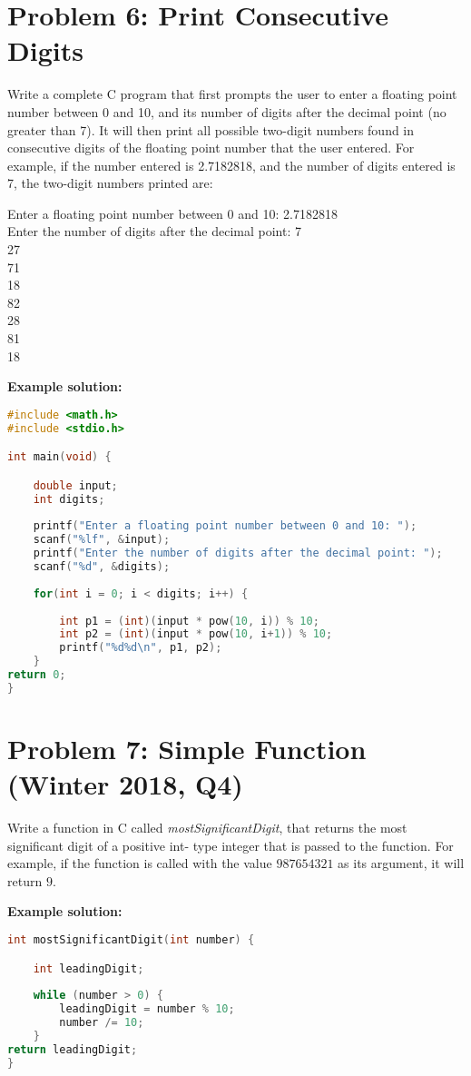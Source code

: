 \documentclass[12pt]{article}
\begin{document}
\section*{Problem 6: Print Consecutive Digits}

Write a complete C program that first prompts the user to enter a floating point number between 0 and 10, and its number of digits after the decimal point (no greater than 7). It will then print all possible two-digit numbers found in consecutive digits of the floating point number that the user entered. For example, if the number entered is 2.7182818, and the number of digits entered is 7, the two-digit numbers printed are:

\begin{tcolorbox}[colback=gray!10, boxrule=0pt, sharp corners, enhanced jigsaw, left=3mm, right=3mm, top=1mm, bottom=1mm]
	Enter a floating point number between 0 and 10: 2.7182818\\
	 Enter the number of digits after the decimal point: 7\\
	27\\
	71\\
	18\\ 
	82\\
	28\\ 
	81\\
	18
\end{tcolorbox}

\textbf{Example solution:}
\begin{lstlisting}[language=C]
#include <math.h> 
#include <stdio.h> 

int main(void) {

	double input;
	int digits;
	
	printf("Enter a floating point number between 0 and 10: "); 
	scanf("%lf", &input);
	printf("Enter the number of digits after the decimal point: "); 
	scanf("%d", &digits);
	
	for(int i = 0; i < digits; i++) {
	
		int p1 = (int)(input * pow(10, i)) % 10;
		int p2 = (int)(input * pow(10, i+1)) % 10; 
		printf("%d%d\n", p1, p2);
	}
return 0; 
}
\end{lstlisting}


\section*{Problem 7: Simple Function (Winter 2018, Q4)}
Write a function in C called \textit{mostSignificantDigit}, that returns the most significant digit of a positive int- type integer that is passed to the function. For example, if the function is called with the value $987654321$ as its argument, it will return $9$.

\textbf{Example solution:}
\begin{lstlisting}[language=C]
int mostSignificantDigit(int number) { 

	int leadingDigit;
	
	while (number > 0) { 
		leadingDigit = number % 10; 
		number /= 10;
	}
return leadingDigit; 
}

\end{lstlisting}
\end{document}
